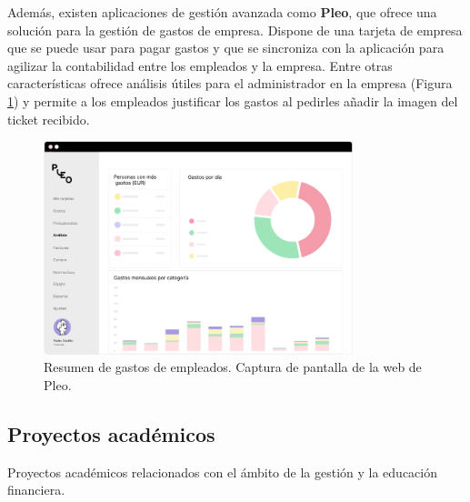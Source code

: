 Además, existen aplicaciones de gestión avanzada como \textbf{Pleo}\cite{gastos-pleo}, que ofrece una solución para la gestión 
de gastos de empresa. Dispone de una tarjeta 
de empresa que se puede usar para pagar gastos y que se sincroniza con la aplicación 
para agilizar la contabilidad entre los empleados y la empresa. 
Entre otras características ofrece análisis útiles para el administrador en la empresa (Figura \ref{fig:resumen_gastos_pleo})
y permite a los empleados justificar los gastos al pedirles añadir la imagen del ticket recibido.\\
\begin{figure}[ht!]
    \centering
    \includegraphics[width = 90mm]{imagenes/resumen-gastos-pleo.png}
    \caption{Resumen de gastos de empleados. Captura de pantalla de la web de Pleo.}
    \label{fig:resumen_gastos_pleo}
\end{figure}


\subsection{Proyectos académicos}
Proyectos académicos relacionados con el ámbito de la gestión y la educación financiera.

